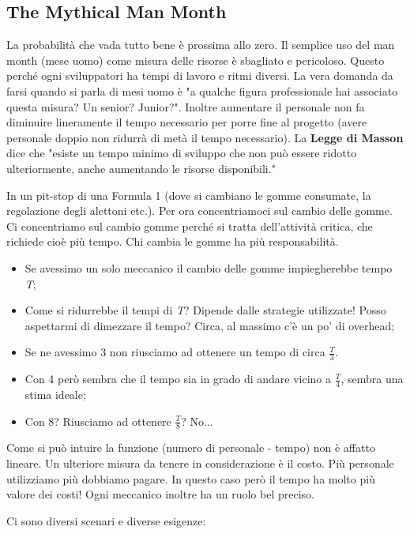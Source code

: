 \subsection{The Mythical Man Month}
La probabilità che vada tutto bene è prossima allo zero.
Il semplice uso del man month (mese uomo) come misura delle risorse è sbagliato e pericoloso. Questo perché ogni sviluppatori ha tempi di lavoro e ritmi diversi. La vera domanda da farsi quando si parla di mesi uomo è "a qualche figura professionale hai associato questa misura? Un senior? Junior?".
Inoltre aumentare il personale non fa diminuire lineramente il tempo necessario per porre fine al progetto (avere personale doppio non ridurrà di metà il tempo necessario).\newline
La \textbf{Legge di Masson} dice che "esiste un tempo minimo di sviluppo che non può essere ridotto ulteriormente, anche aumentando le risorse disponibili."
\begin{info}[Esempio]
	In un pit-stop di una Formula 1 (dove si cambiano le gomme consumate, la regolazione degli alettoni etc.). Per ora concentriamoci sul cambio delle gomme. Ci concentriamo sul cambio gomme perché si tratta dell'attività critica, che richiede cioè più tempo. Chi cambia le gomme ha più responsabilità.
	\begin{itemize}
		\item Se avessimo un solo meccanico il cambio delle gomme impiegherebbe tempo \textit{T};
		\item Come si ridurrebbe il tempi di \textit{T}? Dipende dalle strategie utilizzate! Posso aspettarmi di dimezzare il tempo? Circa, al massimo c'è un po' di overhead;
		\item Se ne avessimo 3 non riusciamo ad ottenere un tempo di circa $\frac{T}{3}$.
		\item Con 4 però sembra che il tempo sia in grado di andare vicino a $\frac{T}{4}$, sembra una stima ideale;
		\item Con 8? Riusciamo ad ottenere $\frac{T}{8}$? No...
	\end{itemize}
	Come si può intuire la funzione (numero di personale - tempo) non è affatto lineare.
	Un ulteriore misura da tenere in considerazione è il costo. Più personale utilizziamo più dobbiamo pagare.\newline
	In questo caso però il tempo ha molto più valore dei costi!\newline
	Ogni meccanico inoltre ha un ruolo bel preciso.
\end{info}
Ci sono diversi scenari e diverse esigenze:
